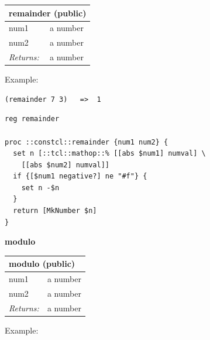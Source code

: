 \documentclass[twoside,9pt]{report}
\begin{document}
\begin{tabular}{ |l l| }
\hline
\multicolumn{2}{|l|}{remainder (public)} \\
\hline
num1 & a number \\
num2 & a number \\
\textit{Returns:} & a number \\
\hline
\end{tabular}


Example:

\noindent\makebox[\linewidth]{\rule{\linewidth}{0.4pt}}
\begin{lstlisting}
(remainder 7 3)   =>  1
\end{lstlisting}
\noindent\makebox[\linewidth]{\rule{\linewidth}{0.4pt}}
\noindent\makebox[\linewidth]{\rule{\linewidth}{0.4pt}}
\begin{lstlisting}
reg remainder
 
proc ::constcl::remainder {num1 num2} {
  set n [::tcl::mathop::% [[abs $num1] numval] \
    [[abs $num2] numval]]
  if {[$num1 negative?] ne "#f"} {
    set n -$n
  }
  return [MkNumber $n]
}
\end{lstlisting}
\noindent\makebox[\linewidth]{\rule{\linewidth}{0.4pt}}

\textbf{modulo}

\begin{tabular}{ |l l| }
\hline
\multicolumn{2}{|l|}{modulo (public)} \\
\hline
num1 & a number \\
num2 & a number \\
\textit{Returns:} & a number \\
\hline
\end{tabular}


Example:
\end{document}
